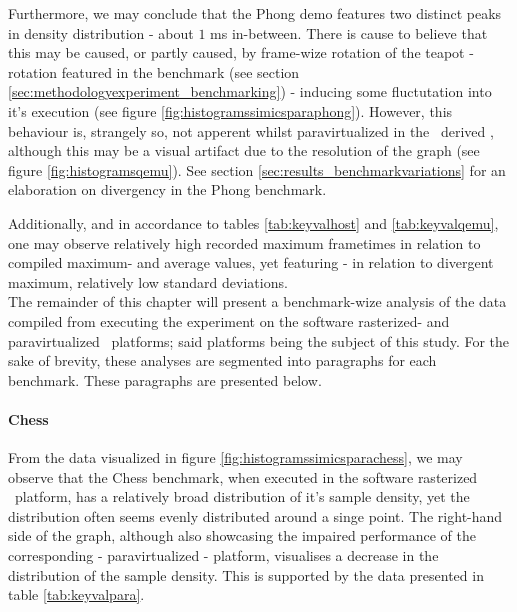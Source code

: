 Furthermore, we may conclude that the Phong demo features two distinct peaks in density distribution - about $1$ ms in-between.
There is cause to believe that this may be caused, or partly caused, by frame-wize rotation of the teapot - rotation featured in the benchmark (see section \ref{sec:methodologyexperiment_benchmarking}) - inducing some fluctutation into it's execution (see figure \ref{fig:histogramssimicsparaphong}).
However, this behaviour is, strangely so, not apperent whilst paravirtualized in the \dvttermqemu\ derived \dvttermandroidemulator , although this may be a visual artifact due to the resolution of the graph (see figure \ref{fig:histogramsqemu}).
See section \ref{sec:results_benchmarkvariations} for an elaboration on divergency in the Phong benchmark.

Additionally, and in accordance to tables \ref{tab:keyvalhost} and \ref{tab:keyvalqemu}, one may observe relatively high recorded maximum frametimes in relation to compiled maximum- and average values, yet featuring - in relation to divergent maximum, relatively low standard deviations.\\

\noindent
The remainder of this chapter will present a benchmark-wize analysis of the data compiled from executing the experiment on the software rasterized- and paravirtualized \dvttermsimics\ platforms; said platforms being the subject of this study.
For the sake of brevity, these analyses are segmented into paragraphs for each benchmark.
These paragraphs are presented below.













\paragraph{Chess}
\label{par:results_chess}
From the data visualized in figure \ref{fig:histogramssimicsparachess}, we may observe that the Chess benchmark, when executed in the software rasterized \dvttermsimics\ platform, has a relatively broad distribution of it's sample density, yet the distribution often seems evenly distributed around a singe point.
The right-hand side of the graph, although also showcasing the impaired performance of the corresponding - paravirtualized - platform, visualises a decrease in the distribution of the sample density.
This is supported by the data presented in table \ref{tab:keyvalpara}.


